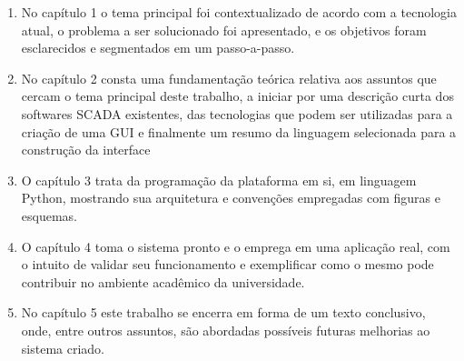 \begin{enumerate}
	\item No capítulo 1 o tema principal foi contextualizado de acordo com a tecnologia atual, o problema a ser solucionado foi apresentado, e os objetivos foram esclarecidos e segmentados em um passo-a-passo.
	\item No capítulo 2 consta uma fundamentação teórica relativa aos assuntos que cercam o tema principal deste trabalho, a iniciar por uma descrição curta dos softwares SCADA existentes, das tecnologias que podem ser utilizadas para a criação de uma GUI e finalmente um resumo da linguagem selecionada para a construção da interface
	\item O capítulo 3 trata da programação da plataforma em si, em linguagem Python, mostrando sua arquitetura e convenções empregadas com figuras e esquemas.
	\item O capítulo 4 toma o sistema pronto e o emprega em uma aplicação real, com o intuito de validar seu funcionamento e exemplificar como o mesmo pode contribuir no ambiente acadêmico da universidade.
	\item No capítulo 5 este trabalho se encerra em forma de um texto conclusivo, onde, entre outros assuntos, são abordadas possíveis futuras melhorias ao sistema criado.
\end{enumerate}